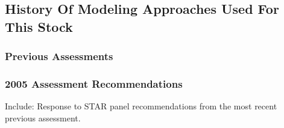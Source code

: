 \documentclass[12pt,]{article}
\begin{document}
\subsection{History Of Modeling Approaches Used For This
Stock}\label{history-of-modeling-approaches-used-for-this-stock}

\subsubsection{Previous Assessments}\label{previous-assessments}

\subsubsection{2005 Assessment
Recommendations}\label{assessment-recommendations}

Include: Response to STAR panel recommendations from the most recent
previous assessment.
\end{document}
